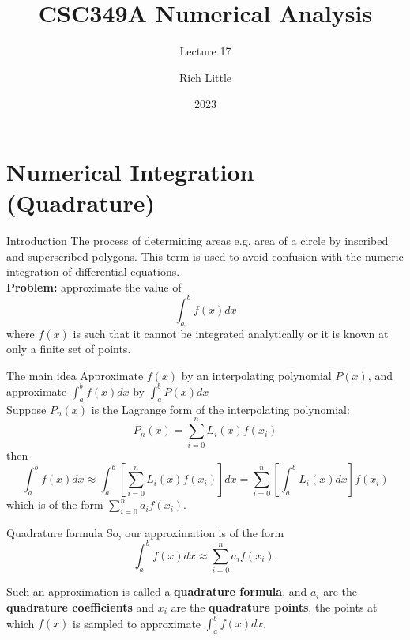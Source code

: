 \documentclass[12pt]{beamer}
\title[CSC349A Numerical Analysis]{CSC349A Numerical Analysis}
\subtitle[Lecture 17]{Lecture 17}
\date[2023]{2023}
\author[R. Little]{Rich Little}
\institute[University of Victoria]{University of Victoria}
\begin{document}
\frame{\maketitle} %



\section{Numerical Integration (Quadrature)} 


\begin{frame}{Introduction} 
The process of determining areas e.g. area of a circle by inscribed
and superscribed polygons. This term is used to avoid confusion with
the numeric integration of differential equations.
\\
\noindent 
{\bf Problem:} approximate the value of 
\[
\int_a^{b} f(x) dx
\] 
\noindent 
where $f(x)$ is such that it cannot be integrated analytically or it is known at only a finite set of points. 
\end{frame} 

\begin{frame}{The main idea}
Approximate $f(x)$ by an interpolating polynomial $P(x)$, and approximate $\int_{a}^{b} f(x)dx$ by $\int_a^{b} P(x)dx$
\\
Suppose $P_n(x)$ is the Lagrange form of the interpolating polynomial: 
\[
P_n(x) = \sum_{i=0}^{n} L_i(x) f(x_i)
\]
\noindent 
then 
\[
\int_{a}^{b} f(x)dx \approx \int_{a}^{b} \left [ \sum_{i=0}^{n} L_i(x) f(x_i) \right ] dx = \sum_{i=0}^{n} \left[ \int_a^b L_i(x) dx \right ] f(x_i) 
\]
\noindent 
which is of the form $\sum_{i=0}^{n} a_i f(x_i)$. 
\end{frame} 

\begin{frame}{Quadrature formula} 
So, our approximation is of the form
\[
\int_{a}^{b} f(x)dx \approx \sum_{i=0}^{n} a_i f(x_i).
\]

Such an approximation is called a {\bf quadrature formula}, and $a_i$ are
the {\bf quadrature coefficients} and $x_i$ are the {\bf quadrature points},
the points at which $f(x)$ is sampled to approximate $\int_{a}^{b}
f(x)dx$.

\end{frame} 
\end{document}
